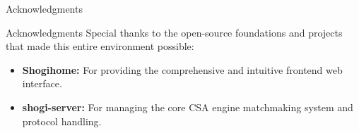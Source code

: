 \documentclass[aspectratio=169]{beamer}
\begin{document}
\begin{frame}{Acknowledgments}
    \begin{block}{Acknowledgments}
        Special thanks to the open-source foundations and projects that made this entire environment possible:
        \vspace{0.5em}
        \begin{itemize}
            \item \textbf{Shogihome:} For providing the comprehensive and intuitive frontend web interface.
            \item \textbf{shogi-server:} For managing the core CSA engine matchmaking system and protocol handling.
        \end{itemize}
    \end{block}
\end{frame}
\end{document}
